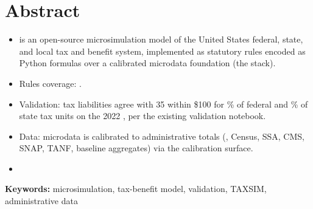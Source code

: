 \section*{Abstract}


\begin{itemize}
\item \policyengineus{} is an open-source microsimulation model of the
United States federal, state, and local tax and benefit system, implemented
as statutory rules encoded as Python formulas over a calibrated microdata
foundation (the \microcosm{} stack).
\item Rules coverage: .
\item Validation: \policyengineus{} tax liabilities agree with \taxsim{}35
within \$100 for \% of federal and \% of state tax units on
the 2022 \cps{}, per the existing validation notebook.
\item Data: microdata is calibrated to administrative totals (\soi{}, Census,
SSA, CMS, SNAP, TANF, \cbo{} baseline aggregates) via the \microcosm{}
calibration surface.
\item {}
\end{itemize}

\vspace{1em}
\noindent\textbf{Keywords:} microsimulation, tax-benefit model, validation,
TAXSIM, administrative data
